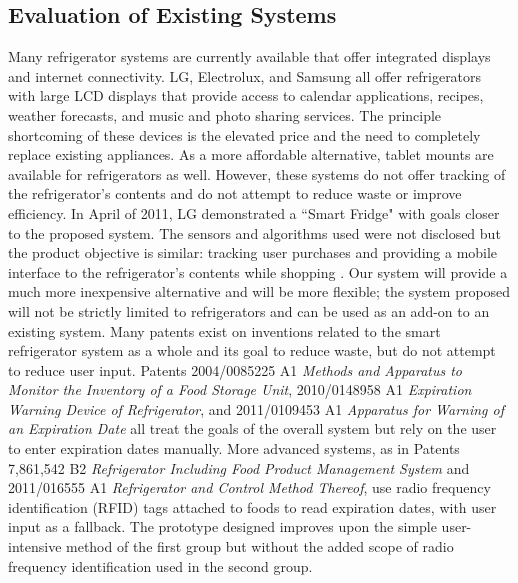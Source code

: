 \documentclass[11pt]{article} %
\begin{document}
\subsection{Evaluation of Existing Systems}
Many refrigerator systems are currently available that offer integrated displays and internet connectivity. LG, Electrolux, and Samsung all offer refrigerators with large LCD displays that provide access to calendar applications, recipes, weather forecasts, and music and photo sharing services. The principle shortcoming of these devices is the elevated price and the need to completely replace existing appliances. As a more affordable alternative, tablet mounts are available for refrigerators as well.
However, these systems do not offer tracking of the refrigerator's contents and do not attempt to reduce waste or improve efficiency. In April of 2011, LG demonstrated a ``Smart Fridge" with goals closer to the proposed system. The sensors and algorithms used were not disclosed but the product objective is similar: tracking user purchases and providing a mobile interface to the refrigerator's contents while shopping \cite{lg}. Our system will provide a much more inexpensive alternative and will be more flexible; the system proposed will not be strictly limited to refrigerators and can be used as an add-on to an existing system.
\newline \quad \newline
Many patents exist on inventions related to the smart refrigerator system as a whole and its goal to reduce waste, but do not attempt to reduce user input. Patents 2004/0085225 A1 \emph{Methods and Apparatus to Monitor the Inventory of a Food Storage Unit}, 2010/0148958 A1 \emph{Expiration Warning Device of Refrigerator}, and 2011/0109453 A1 \emph{Apparatus for Warning of an Expiration Date} all treat the goals of the overall system but rely on the user to enter expiration dates manually. More advanced systems, as in Patents 7,861,542 B2 \emph{Refrigerator Including Food Product Management System} and 2011/016555 A1 \emph {Refrigerator and Control Method Thereof}, use radio frequency identification (RFID) tags attached to foods to read expiration dates, with user input as a fallback. The prototype designed improves upon the simple user-intensive method of the first group but without the added scope of radio frequency identification used in the second group.
\end{document}
